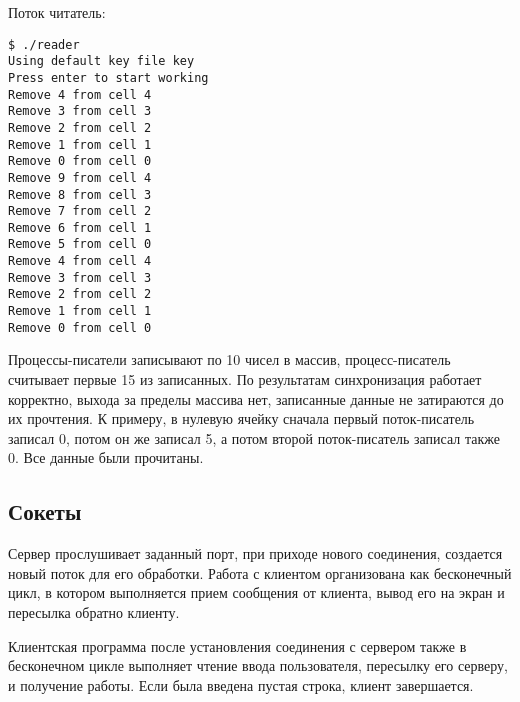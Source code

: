 \documentclass[a4paper]{article}
\begin{document}
	Поток читатель:
	\begin{lstlisting}[style=crs_bash]
$ ./reader 
Using default key file key
Press enter to start working
Remove 4 from cell 4
Remove 3 from cell 3
Remove 2 from cell 2
Remove 1 from cell 1
Remove 0 from cell 0
Remove 9 from cell 4
Remove 8 from cell 3
Remove 7 from cell 2
Remove 6 from cell 1
Remove 5 from cell 0
Remove 4 from cell 4
Remove 3 from cell 3
Remove 2 from cell 2
Remove 1 from cell 1
Remove 0 from cell 0
	\end{lstlisting}
	
	Процессы-писатели записывают по 10 чисел в массив, процесс-писатель считывает первые 15 из записанных. По результатам синхронизация работает корректно, выхода за пределы массива нет, записанные данные не затираются до их прочтения. К примеру, в нулевую ячейку сначала первый поток-писатель записал 0, потом он же записал 5, а потом второй поток-писатель записал также 0. Все данные были прочитаны.

\subsection{Сокеты}
	Сервер прослушивает заданный порт, при приходе нового соединения, создается новый поток для его обработки. Работа с клиентом организована как бесконечный цикл, в котором выполняется прием сообщения от клиента, вывод его на экран и пересылка обратно клиенту.
	
	Клиентская программа после установления соединения с сервером также в бесконечном цикле выполняет чтение ввода пользователя, пересылку его серверу, и получение работы. Если была введена пустая строка, клиент завершается.
	
\end{document}
